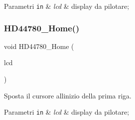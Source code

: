 \begin{DoxyParams}[1]{Parametri}
\mbox{\tt in}  & {\em lcd} & display da pilotare; \\
\hline
\end{DoxyParams}
\mbox{\label{group___h_d44780_ga68e3712332aa9482d4bdaa4991a92127}} 
\subsubsection{\texorpdfstring{H\+D44780\+\_\+\+Home()}{HD44780\_Home()}}
{\footnotesize\ttfamily void H\+D44780\+\_\+\+Home (\begin{DoxyParamCaption}\item[{\hyperlink{struct_h_d44780___l_c_d__t}{H\+D44780\+\_\+\+L\+C\+D\+\_\+t} $\ast$}]{lcd }\end{DoxyParamCaption})}



Sposta il cursore all\textquotesingle{}inizio della prima riga. 


\begin{DoxyParams}[1]{Parametri}
\mbox{\tt in}  & {\em lcd} & display da pilotare; \\
\hline
\end{DoxyParams}
\mbox{\label{group___h_d44780_ga0c08f9e41d770ebfa4af385a56b47b81}} 
